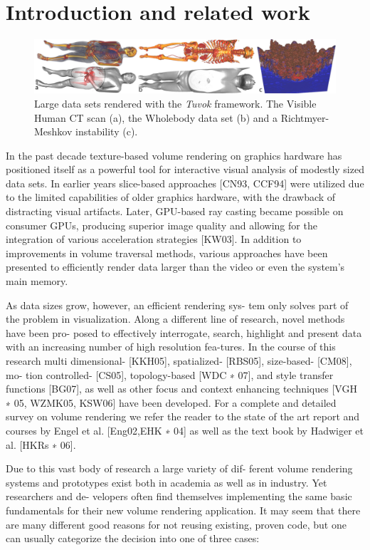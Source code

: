 \section{Introduction and related work}

\begin{figure}
	\includegraphics[width=\linewidth]{images/arch/vh-rm}

  \caption{Large data sets rendered with the \textit{Tuvok} framework.
  The Visible Human CT scan (a), the Wholebody data set (b) and a
  Richtmyer-Meshkov instability (c).}
	\label{fig:tvktease}
\end{figure}

In the past decade texture-based volume rendering on graphics
hardware has positioned itself as a powerful tool for interactive
visual analysis of modestly sized data sets. In earlier years
slice-based approaches [CN93, CCF94] were utilized due to the limited
capabilities of older graphics hardware, with the drawback of
distracting visual artifacts. Later, GPU-based ray casting became
possible on consumer GPUs, producing superior image quality and
allowing for the integration of various acceleration strategies
[KW03]. In addition to improvements in volume traversal methods,
various approaches have been presented to efficiently render data
larger than the video or even the system's main memory.

As data sizes grow, however, an efficient rendering sys-
tem only solves part of the problem in visualization. Along
a different line of research, novel methods have been pro-
posed to effectively interrogate, search, highlight and present
data with an increasing number of high resolution fea-tures. In the course of
this research multi dimensional-
[KKH05], spatialized- [RBS05], size-based- [CM08], mo-
tion controlled- [CS05], topology-based [WDC ∗ 07], and
style transfer functions [BG07], as well as other focus
and context enhancing techniques [VGH ∗ 05, WZMK05,
KSW06] have been developed. For a complete and detailed
survey on volume rendering we refer the reader to the state
of the art report and courses by Engel et al. [Eng02,EHK ∗ 04]
as well as the text book by Hadwiger et al. [HKRs ∗ 06].

Due to this vast body of research a large variety of dif-
ferent volume rendering systems and prototypes exist both
in academia as well as in industry. Yet researchers and de-
velopers often find themselves implementing the same basic
fundamentals for their new volume rendering application. It
may seem that there are many different good reasons for not
reusing existing, proven code, but one can usually categorize
the decision into one of three cases:

